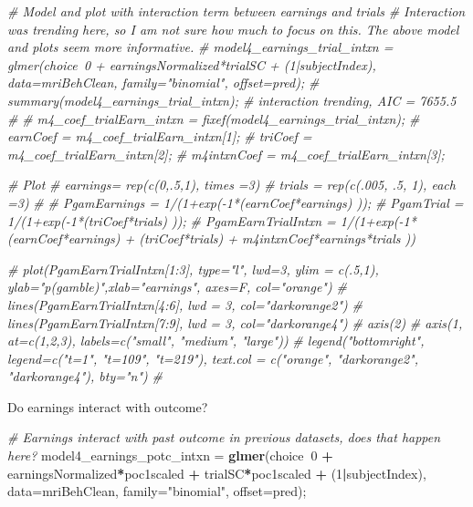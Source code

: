 \documentclass[]{article}
\newenvironment{Shaded}{\begin{snugshade}}{\end{snugshade}}
\newcommand{\CommentTok}[1]{\textcolor[rgb]{0.56,0.35,0.01}{\textit{#1}}}
\newcommand{\DataTypeTok}[1]{\textcolor[rgb]{0.13,0.29,0.53}{#1}}
\newcommand{\DecValTok}[1]{\textcolor[rgb]{0.00,0.00,0.81}{#1}}
\newcommand{\KeywordTok}[1]{\textcolor[rgb]{0.13,0.29,0.53}{\textbf{#1}}}
\newcommand{\NormalTok}[1]{#1}
\newcommand{\OperatorTok}[1]{\textcolor[rgb]{0.81,0.36,0.00}{\textbf{#1}}}
\newcommand{\StringTok}[1]{\textcolor[rgb]{0.31,0.60,0.02}{#1}}
\begin{document}
\begin{Shaded}
\begin{Highlighting}[]
\CommentTok{# Model and plot with interaction term between earnings and trials}
    \CommentTok{# Interaction was trending here, so I am not sure how much to focus on this. The above model and plots seem more informative.}
\CommentTok{# model4_earnings_trial_intxn = glmer(choice~0 + earningsNormalized*trialSC + (1|subjectIndex), data=mriBehClean, family="binomial", offset=pred);}
\CommentTok{# summary(model4_earnings_trial_intxn); # interaction trending, AIC = 7655.5}
\CommentTok{# }
\CommentTok{# m4_coef_trialEarn_intxn = fixef(model4_earnings_trial_intxn);}
\CommentTok{# earnCoef = m4_coef_trialEarn_intxn[1];}
\CommentTok{# triCoef = m4_coef_trialEarn_intxn[2];}
\CommentTok{# m4intxnCoef = m4_coef_trialEarn_intxn[3];}

\CommentTok{# Plot}
\CommentTok{# earnings= rep(c(0,.5,1), times =3)}
\CommentTok{# trials = rep(c(.005, .5, 1), each =3)}
\CommentTok{# }
\CommentTok{# PgamEarnings = 1/(1+exp(-1*(earnCoef*earnings) ));}
\CommentTok{# PgamTrial = 1/(1+exp(-1*(triCoef*trials) ));}
\CommentTok{# PgamEarnTrialIntxn = 1/(1+exp(-1*(earnCoef*earnings) + (triCoef*trials) + m4intxnCoef*earnings*trials ))}

\CommentTok{# plot(PgamEarnTrialIntxn[1:3], type="l", lwd=3, ylim = c(.5,1), ylab="p(gamble)",xlab="earnings", axes=F, col="orange")}
\CommentTok{# lines(PgamEarnTrialIntxn[4:6], lwd = 3, col="darkorange2")}
\CommentTok{# lines(PgamEarnTrialIntxn[7:9], lwd = 3, col="darkorange4")}
\CommentTok{# axis(2)}
\CommentTok{# axis(1, at=c(1,2,3), labels=c("small", "medium", "large"))}
\CommentTok{# legend("bottomright", legend=c("t=1", "t=109", "t=219"), text.col = c("orange", "darkorange2", "darkorange4"), bty="n")}
\CommentTok{# }
\end{Highlighting}
\end{Shaded}

Do earnings interact with outcome?

\begin{Shaded}
\begin{Highlighting}[]
\CommentTok{# Earnings interact with past outcome in previous datasets, does that happen here?}
\NormalTok{model4_earnings_potc_intxn =}\StringTok{ }\KeywordTok{glmer}\NormalTok{(choice}\OperatorTok{~}\DecValTok{0} \OperatorTok{+}\StringTok{ }\NormalTok{earningsNormalized}\OperatorTok{*}\NormalTok{poc1scaled }\OperatorTok{+}\StringTok{ }\NormalTok{trialSC}\OperatorTok{*}\NormalTok{poc1scaled }\OperatorTok{+}\StringTok{ }\NormalTok{(}\DecValTok{1}\OperatorTok{|}\NormalTok{subjectIndex), }\DataTypeTok{data=}\NormalTok{mriBehClean, }\DataTypeTok{family=}\StringTok{"binomial"}\NormalTok{, }\DataTypeTok{offset=}\NormalTok{pred);}
\end{Highlighting}
\end{Shaded}
\end{document}

